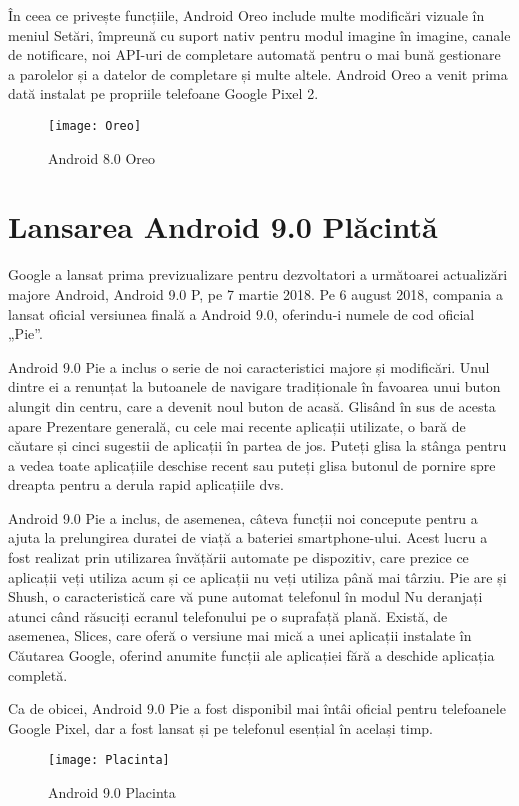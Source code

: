 \documentclass[a4paper,12pt]{amsbook}
\begin{document}
În ceea ce privește funcțiile, Android Oreo include multe modificări vizuale în meniul Setări, împreună cu suport nativ pentru modul imagine în imagine, canale de notificare, noi API-uri de completare automată pentru o mai bună gestionare a parolelor și a datelor de completare și multe altele. Android Oreo a venit prima dată instalat pe propriile telefoane Google Pixel 2.
\begin{figure}[h]
	\centering
	\texttt{[image: Oreo]}
	\caption[Oreo]{Android 8.0 Oreo}
	\label{fig:oreo}
\end{figure}
\par
\chapter{\Large Lansarea Android 9.0 Plăcintă}
\par
Google a lansat prima previzualizare pentru dezvoltatori a următoarei actualizări majore Android, Android 9.0 P, pe 7 martie 2018. Pe 6 august 2018, compania a lansat oficial versiunea finală a Android 9.0, oferindu-i numele de cod oficial „Pie”.
\par
Android 9.0 Pie a inclus o serie de noi caracteristici majore și modificări. Unul dintre ei a renunțat la butoanele de navigare tradiționale în favoarea unui buton alungit din centru, care a devenit noul buton de acasă. Glisând în sus de acesta apare Prezentare generală, cu cele mai recente aplicații utilizate, o bară de căutare și cinci sugestii de aplicații în partea de jos. Puteți glisa la stânga pentru a vedea toate aplicațiile deschise recent sau puteți glisa butonul de pornire spre dreapta pentru a derula rapid aplicațiile dvs.
\par
Android 9.0 Pie a inclus, de asemenea, câteva funcții noi concepute pentru a ajuta la prelungirea duratei de viață a bateriei smartphone-ului. Acest lucru a fost realizat prin utilizarea învățării automate pe dispozitiv, care prezice ce aplicații veți utiliza acum și ce aplicații nu veți utiliza până mai târziu. Pie are și Shush, o caracteristică care vă pune automat telefonul în modul Nu deranjați atunci când răsuciți ecranul telefonului pe o suprafață plană. Există, de asemenea, Slices, care oferă o versiune mai mică a unei aplicații instalate în Căutarea Google, oferind anumite funcții ale aplicației fără a deschide aplicația completă.
\par
Ca de obicei, Android 9.0 Pie a fost disponibil mai întâi oficial pentru telefoanele Google Pixel, dar a fost lansat și pe telefonul esențial în același timp.
\begin{figure}[h]
	\centering
	\texttt{[image: Placinta]}
	\caption[Placinta]{Android 9.0 Placinta}
	\label{fig:placinta}
\end{figure}
\par
\end{document}
